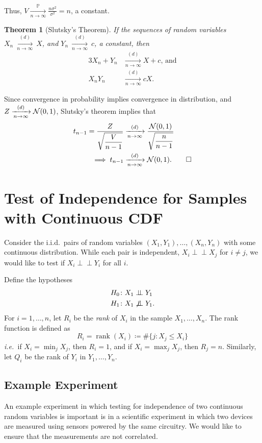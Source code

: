 \documentclass[letterpaper, reqno]{amsart}
\newtheorem{theorem}{Theorem}[section]
\numberwithin{equation}{section}
\newcommand{\ie}{\emph{i.e.\ }}
\newcommand{\ddfrac}[2]{\frac{\displaystyle #1}{\displaystyle #2}}
\newcommand{\N}[2]{\mathcal{N}\mleft( #1, #2 \mright)}
\newcommand{\indep}{\perp \!\!\! \perp}  %
\newcommand{\nindep}{\centernot\indep}
\newcommand{\iid}{i.i.d.}
\newcommand{\Plim}{\xrightarrow[n \to \infty]{\mathbb{P}}}
\newcommand{\Dlim}{\xrightarrow[n \to \infty]{(d)}}
\begin{document}
Thus, $V \Plim \frac{n \sigma^2}{\sigma^2} = n$, a constant. 

\begin{theorem}[Slutsky's Theorem]
  If the sequences of random variables $X_n~\Dlim~X$, and $Y_n~\Dlim~c$,
  a constant, then
  \begin{alignat*}{3}
    X_n + Y_n &\Dlim X + c \text{, and} \\
    X_n Y_n &\Dlim cX.
  \end{alignat*}
\end{theorem}

Since convergence in probability implies convergence in distribution, and $Z
\Dlim \N{0}{1}$, Slutsky's theorem implies that
\begin{align*}
  t_{n-1} = \ddfrac{Z}{\sqrt{\frac{V}{n-1}}} 
        &\Dlim \ddfrac{\N{0}{1}}{\sqrt{\frac{n}{n-1}}} \\
        \implies t_{n-1} &\Dlim \N{0}{1}.  \qed
\end{align*}

\clearpage
\section{Test of Independence for Samples with Continuous CDF}
Consider the \iid\ pairs of random variables $(X_1, Y_1), \dots, (X_n, Y_n)$
with some continuous distribution. While each pair is independent, $X_i \indep
X_j$ for $i \ne j$, we would like to test if $X_i \indep Y_i$ for all $i$.

Define the hypotheses
\begin{align*}
  H_0 &\colon X_1 \indep Y_1 \\
  H_1 &\colon X_1 \nindep Y_1.
\end{align*}
For $i = 1, \dots, n$, let $R_i$ be the \emph{rank} of $X_i$ in the sample $X_1,
\dots, X_n$. The rank function is defined as
\[ R_i = \operatorname{rank}(X_i) \coloneqq \#\{j \colon X_j \le X_i\}  \]
\ie if $X_i = \min_j X_j$, then $R_i = 1$, and if $X_i = \max_j
X_j$, then $R_j = n$. 
Similarly, let $Q_i$ be the rank of $Y_i$ in $Y_1, \dots, Y_n$.

\subsection{Example Experiment}
An example experiment in which testing for independence of two continuous random
variables is important is in a scientific experiment in which two devices are
measured using sensors powered by the same circuitry. We would like to ensure
that the measurements are not correlated.
\end{document}
